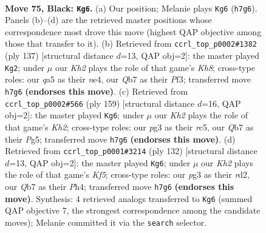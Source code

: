 \documentclass[11pt]{article}
\begin{document}
\clearpage

\begin{figure}[p]\centering
\begin{subfigure}{0.46\textwidth}\centering
\resizebox{\linewidth}{!}{%
\newchessgame
\chessboard[
  setfen={8/1q5k/5p2/Q7/8/4K1P1/7r/8 b - - 1 75},
  showmover=false,
  pgfstyle=straightmove, color=movearrow, markmove={h7-g6}
]}
\caption{}
\end{subfigure}\hfill
\begin{subfigure}{0.46\textwidth}\centering
\resizebox{\linewidth}{!}{%
\newchessgame
\chessboard[
  setfen={7r/2P1K3/8/8/4N3/5p2/8/7k b - - 6 69},
  showmover=false,
  pgfstyle=straightmove, color=movearrow, markmove={h1-g2}
]}
\caption{}
\end{subfigure}
\\[4pt]
\begin{subfigure}{0.46\textwidth}\centering
\resizebox{\linewidth}{!}{%
\newchessgame
\chessboard[
  setfen={8/7k/8/2R3p1/6P1/7r/8/5K2 b - - 3 80},
  showmover=false,
  pgfstyle=straightmove, color=movearrow, markmove={h7-g6}
]}
\caption{}
\end{subfigure}\hfill
\begin{subfigure}{0.46\textwidth}\centering
\resizebox{\linewidth}{!}{%
\newchessgame
\chessboard[
  setfen={8/8/k7/2R2K1p/7P/8/3r4/8 w - - 8 67},
  showmover=false,
  pgfstyle=straightmove, color=movearrow, markmove={f5-g6}
]}
\caption{}
\end{subfigure}
\caption{\textbf{Move 75, Black: \texttt{Kg6}.} (a) Our position; Melanie plays \texttt{Kg6} (\texttt{h7g6}). Panels (b)--(d) are the retrieved master positions whose correspondence most drove this move (highest QAP objective among those that transfer to it). (b) Retrieved from \texttt{ccrl\_top\_p0002\#1382} (ply 137) [structural distance $d$=13, QAP obj=2]: the master played \texttt{Kg2}; under $\mu$ our \emph{Kh2} plays the role of that game's \emph{Kh8}; cross-type roles: our \emph{q}a5 as their \emph{n}e4, our \emph{Q}b7 as their \emph{P}f3; transferred move \texttt{h7g6} \textbf{(endorses this move)}. (c) Retrieved from \texttt{ccrl\_top\_p0002\#566} (ply 159) [structural distance $d$=16, QAP obj=2]: the master played \texttt{Kg6}; under $\mu$ our \emph{Kh2} plays the role of that game's \emph{Kh2}; cross-type roles: our \emph{p}g3 as their \emph{r}c5, our \emph{Q}b7 as their \emph{P}g5; transferred move \texttt{h7g6} \textbf{(endorses this move)}. (d) Retrieved from \texttt{ccrl\_top\_p0001\#3214} (ply 132) [structural distance $d$=13, QAP obj=2]: the master played \texttt{Kg6}; under $\mu$ our \emph{Kh2} plays the role of that game's \emph{Kf5}; cross-type roles: our \emph{p}g3 as their \emph{r}d2, our \emph{Q}b7 as their \emph{P}h4; transferred move \texttt{h7g6} \textbf{(endorses this move)}. Synthesis: 4 retrieved analogs transferred to \texttt{Kg6} (summed QAP objective 7, the strongest correspondence among the candidate moves); Melanie committed it via the \texttt{search} selector.}
\label{fig:thought-m149}
\end{figure}
\end{document}
